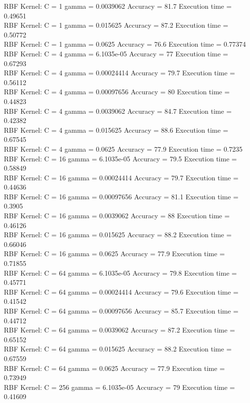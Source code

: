 \documentclass[paper=a4, fontsize=11pt]{scrartcl} %
\numberwithin{equation}{section} %
\numberwithin{figure}{section} %
\numberwithin{table}{section} %
\begin{document}
RBF Kernel: C = 1 gamma = 0.0039062 Accuracy = 81.7 Execution time = 0.49651\\
RBF Kernel: C = 1 gamma = 0.015625 Accuracy = 87.2 Execution time = 0.50772\\
RBF Kernel: C = 1 gamma = 0.0625 Accuracy = 76.6 Execution time = 0.77374\\
RBF Kernel: C = 4 gamma = 6.1035e-05 Accuracy = 77 Execution time = 0.67293\\
RBF Kernel: C = 4 gamma = 0.00024414 Accuracy = 79.7 Execution time = 0.56112\\
RBF Kernel: C = 4 gamma = 0.00097656 Accuracy = 80 Execution time = 0.44823\\
RBF Kernel: C = 4 gamma = 0.0039062 Accuracy = 84.7 Execution time = 0.42382\\
RBF Kernel: C = 4 gamma = 0.015625 Accuracy = 88.6 Execution time = 0.67545\\
RBF Kernel: C = 4 gamma = 0.0625 Accuracy = 77.9 Execution time = 0.7235\\
RBF Kernel: C = 16 gamma = 6.1035e-05 Accuracy = 79.5 Execution time = 0.58849\\
RBF Kernel: C = 16 gamma = 0.00024414 Accuracy = 79.7 Execution time = 0.44636\\
RBF Kernel: C = 16 gamma = 0.00097656 Accuracy = 81.1 Execution time = 0.3905\\
RBF Kernel: C = 16 gamma = 0.0039062 Accuracy = 88 Execution time = 0.46126\\
RBF Kernel: C = 16 gamma = 0.015625 Accuracy = 88.2 Execution time = 0.66046\\
RBF Kernel: C = 16 gamma = 0.0625 Accuracy = 77.9 Execution time = 0.71855\\
RBF Kernel: C = 64 gamma = 6.1035e-05 Accuracy = 79.8 Execution time = 0.45771\\
RBF Kernel: C = 64 gamma = 0.00024414 Accuracy = 79.6 Execution time = 0.41542\\
RBF Kernel: C = 64 gamma = 0.00097656 Accuracy = 85.7 Execution time = 0.44712\\
RBF Kernel: C = 64 gamma = 0.0039062 Accuracy = 87.2 Execution time = 0.65152\\
RBF Kernel: C = 64 gamma = 0.015625 Accuracy = 88.2 Execution time = 0.67559\\
RBF Kernel: C = 64 gamma = 0.0625 Accuracy = 77.9 Execution time = 0.73949\\
RBF Kernel: C = 256 gamma = 6.1035e-05 Accuracy = 79 Execution time = 0.41609\\
\end{document}
